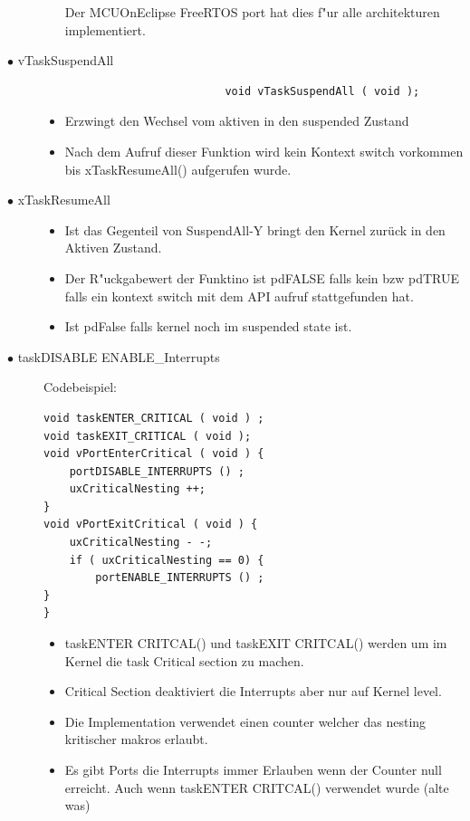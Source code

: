 \documentclass[a4paper, 8pt]{extarticle}
\begin{document}
\begin{multicols*}{3}
\begin{description}
\begin{itemize}
								  Der MCUOnEclipse FreeRTOS port hat dies f"ur alle architekturen implementiert.
						\end{itemize} 	
					\item[$\bullet$ vTaskSuspendAll]
						\begin{lstlisting}
							void vTaskSuspendAll ( void );
						\end{lstlisting}  
						\begin{itemize}
							\item Erzwingt den Wechsel vom aktiven in den suspended Zustand
							\item Nach dem Aufruf dieser Funktion wird kein Kontext switch vorkommen bis xTaskResumeAll() aufgerufen wurde.					
						\end{itemize} 
					\item[$\bullet$ xTaskResumeAll]
						\begin{itemize}
							\item Ist das Gegenteil von SuspendAll-Y bringt den Kernel zurück in den Aktiven Zustand.
							\item Der R"uckgabewert der Funktino ist pdFALSE falls kein bzw pdTRUE falls ein kontext switch mit dem API aufruf stattgefunden hat.
							\item Ist pdFalse falls kernel noch im suspended state ist.					
						\end{itemize} 
					\item[$\bullet$ taskDISABLE ENABLE\_Interrupts]
					Codebeispiel:
						\begin{lstlisting}
void taskENTER_CRITICAL ( void ) ;
void taskEXIT_CRITICAL ( void );
void vPortEnterCritical ( void ) {
	portDISABLE_INTERRUPTS () ;
	uxCriticalNesting ++;
}
void vPortExitCritical ( void ) {
	uxCriticalNesting - -;
	if ( uxCriticalNesting == 0) {
		portENABLE_INTERRUPTS () ;
}
}
						\end{lstlisting} 						
						\begin{itemize}
							\item taskENTER CRITCAL() und taskEXIT CRITCAL() werden um im Kernel die task Critical section zu machen. 
							\item Critical Section deaktiviert die Interrupts aber nur auf Kernel level.
							\item Die Implementation verwendet einen counter welcher das nesting kritischer makros erlaubt.
							\item Es gibt Ports die Interrupts immer Erlauben wenn der Counter null erreicht. Auch wenn 
								  taskENTER CRITCAL() verwendet wurde (alte was)

\end{itemize}
\end{description}
\end{multicols*}
\end{document}
